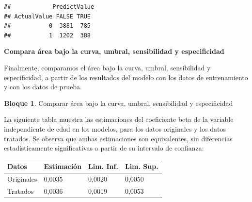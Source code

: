 \documentclass[]{book}
\newenvironment{Shaded}{\begin{snugshade}}{\end{snugshade}}
\newcommand{\NormalTok}[1]{#1}
\newcommand{\OperatorTok}[1]{\textcolor[rgb]{0.81,0.36,0.00}{\textbf{#1}}}
\newcommand{\StringTok}[1]{\textcolor[rgb]{0.31,0.60,0.02}{#1}}
\theoremstyle{definition}
\theoremstyle{definition}
\newtheorem{example}{Bloque}[chapter]
\theoremstyle{definition}
\theoremstyle{definition}
\theoremstyle{remark}
\begin{document}
\begin{verbatim}
##            PredictValue
## ActualValue FALSE TRUE
##           0  3881  785
##           1  1202  388
\end{verbatim}

\textbf{Compara área bajo la curva, umbral, sensibilidad y especificidad}

Finalmente, comparamos el área bajo la curva, umbral, sensibilidad y especificidad, a partir de los resultados del modelo con los datos de entrenamiento y con los datos de prueba.

\begin{example}
\protect\hypertarget{exm:bloque91nbm}{}{\label{exm:bloque91nbm} }Comparar área bajo la curva, umbral, sensibilidad y especificidad
\end{example}

\begin{Shaded}
\end{Shaded}

La siguiente tabla muestra las estimaciones del coeficiente beta de la variable independiente de edad en los modelos, para los datos originales y los datos tratados. Se observa que ambas estimaciones son equivalentes, sin diferencias estadísticamente significativas a partir de su intervalo de confianza:

\begin{longtable}[]{@{}llll@{}}
\toprule
Datos & Estimación & Lim. Inf. & Lim. Sup.\tabularnewline
\midrule
\endhead
Originales & 0,0035 & 0,0020 & 0,0050\tabularnewline
Tratados & 0,0036 & 0,0019 & 0,0053\tabularnewline
\bottomrule
\end{longtable}
\end{document}
